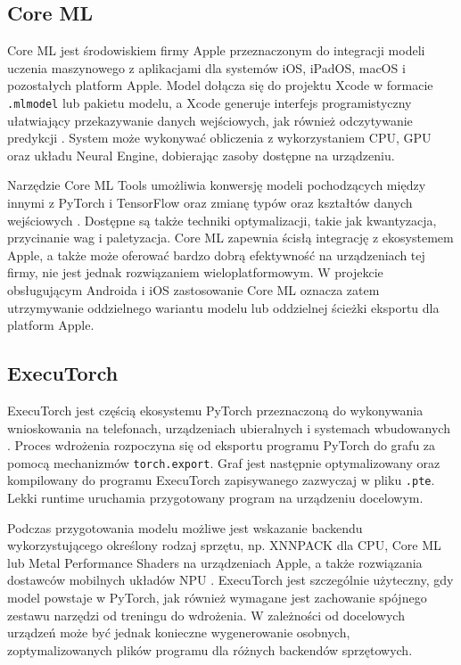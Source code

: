 \subsection{Core ML}

Core ML jest środowiskiem firmy Apple przeznaczonym do integracji modeli uczenia maszynowego z aplikacjami dla systemów iOS, iPadOS, macOS i pozostałych platform Apple. Model dołącza się do projektu Xcode w formacie \texttt{.mlmodel} lub pakietu modelu, a Xcode generuje interfejs programistyczny ułatwiający przekazywanie danych wejściowych, jak również odczytywanie predykcji \cite{coreMLIntegration2026}. System może wykonywać obliczenia z wykorzystaniem CPU, GPU oraz układu Neural Engine, dobierając zasoby dostępne na urządzeniu.

Narzędzie Core ML Tools umożliwia konwersję modeli pochodzących między innymi z PyTorch i TensorFlow oraz zmianę typów oraz kształtów danych wejściowych \cite{coreMLTools2026}. Dostępne są także techniki optymalizacji, takie jak kwantyzacja, przycinanie wag i paletyzacja. Core ML zapewnia ścisłą integrację z ekosystemem Apple, a także może oferować bardzo dobrą efektywność na urządzeniach tej firmy, nie jest jednak rozwiązaniem wieloplatformowym. W projekcie obsługującym Androida i iOS zastosowanie Core ML oznacza zatem utrzymywanie oddzielnego wariantu modelu lub oddzielnej ścieżki eksportu dla platform Apple.

\subsection{ExecuTorch}

ExecuTorch jest częścią ekosystemu PyTorch przeznaczoną do wykonywania wnioskowania na telefonach, urządzeniach ubieralnych i systemach wbudowanych \cite{execuTorch2026}. Proces wdrożenia rozpoczyna się od eksportu programu PyTorch do grafu za pomocą mechanizmów \texttt{torch.export}. Graf jest następnie optymalizowany oraz kompilowany do programu ExecuTorch zapisywanego zazwyczaj w pliku \texttt{.pte}. Lekki runtime uruchamia przygotowany program na urządzeniu docelowym.

Podczas przygotowania modelu możliwe jest wskazanie backendu wykorzystującego określony rodzaj sprzętu, np. XNNPACK dla CPU, Core ML lub Metal Performance Shaders na urządzeniach Apple, a także rozwiązania dostawców mobilnych układów NPU \cite{execuTorchExport2026}. ExecuTorch jest szczególnie użyteczny, gdy model powstaje w PyTorch, jak również wymagane jest zachowanie spójnego zestawu narzędzi od treningu do wdrożenia. W zależności od docelowych urządzeń może być jednak konieczne wygenerowanie osobnych, zoptymalizowanych plików programu dla różnych backendów sprzętowych.


